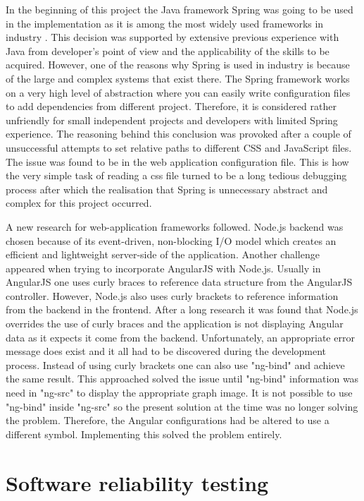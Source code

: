 \documentclass{l4proj}
\begin{document}
In the beginning of this project the Java framework Spring was going to be used in the implementation as it is among the most widely used frameworks in industry \cite{shiLuiLi}. This decision was supported by extensive previous experience with Java from developer's point of view and the applicability of the skills to be acquired. However, one of the reasons why Spring is used in industry is because of the large and complex systems that exist there. The Spring framework works on a very high level of abstraction where you can easily write configuration files to add dependencies from different project. Therefore, it is considered rather unfriendly for small independent projects and developers with limited Spring experience. The reasoning behind this conclusion was provoked after a couple of unsuccessful attempts to set relative paths to different CSS and JavaScript files. The issue was found to be in the web application configuration file. This is how the very simple task of reading a css file turned to be a long tedious debugging process after which the realisation that Spring is unnecessary abstract and complex for this project occurred.

A new research for web-application frameworks followed. Node.js backend was chosen because of its event-driven, non-blocking I/O model which creates an efficient and lightweight server-side of the application. Another challenge appeared when trying to incorporate AngularJS with Node.js. Usually in AngularJS one uses curly braces to reference data structure from the AngularJS controller. However, Node.js also uses curly brackets to reference information from the backend in the frontend. After a long research  it was found that Node.js overrides the use of curly braces and the application is not displaying Angular data as it expects it come from the backend. Unfortunately, an appropriate error message does exist and it all had to be discovered during the development process. Instead of using curly brackets one can also use "ng-bind" and achieve the same result. This approached solved the issue until "ng-bind" information was need in "ng-src" to display the appropriate graph image. It is not possible to use "ng-bind" inside "ng-src" so the present solution at the time was no longer solving the problem. Therefore, the Angular configurations had be altered to use a different symbol. Implementing this solved the problem entirely. 


\section{Software reliability testing}
\end{document}
